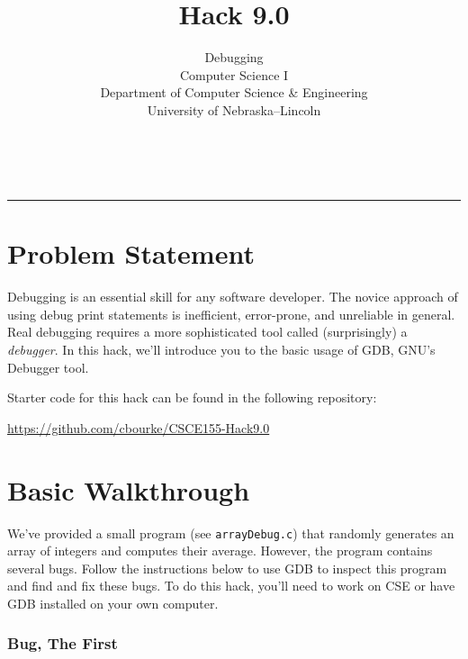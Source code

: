 \documentclass[12pt]{scrartcl}
\title{Hack 9.0}\let\Title\@title
\subtitle{Debugging \\
Computer Science I\\
{\small
\vskip1cm
Department of Computer Science \& Engineering \\
University of Nebraska--Lincoln}
\vskip-1cm}
\date{~}
\begin{document}
\maketitle

\hrule



\section*{Problem Statement}

Debugging is an essential skill for any software developer.  The novice
approach of using debug print statements is inefficient, error-prone, and
unreliable in general.  Real debugging requires a more sophisticated tool
called (surprisingly) a \emph{debugger}.  In this hack, we'll introduce you
to the basic usage of GDB, GNU's Debugger tool.

Starter code for this hack can be found in the following repository:

\url{https://github.com/cbourke/CSCE155-Hack9.0}

\section*{Basic Walkthrough}

We've provided a small program (see \texttt{arrayDebug.c}) 
that randomly generates an array of integers
and computes their average.  However, the program contains several bugs.
Follow the instructions below to use GDB to inspect this program and find
and fix these bugs.  To do this hack, you'll need to work on CSE or have 
GDB installed on your own computer.

\subsubsection*{Bug, The First}
\end{document}
